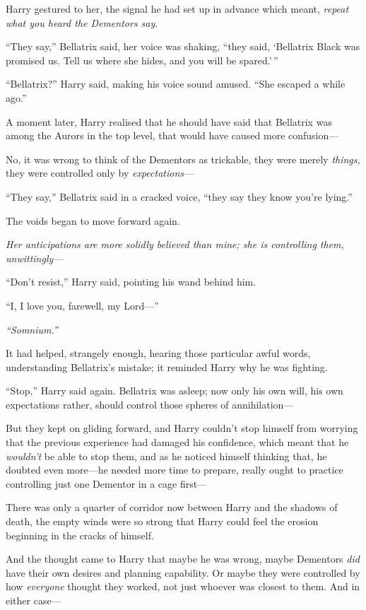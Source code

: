Harry gestured to her, the signal he had set up in advance which meant,
\emph{repeat what you heard the Dementors say.}

``They say,'' Bellatrix said, her voice was shaking, ``they said,
`Bellatrix Black was promised us. Tell us where she hides, and you will
be spared.'\,''

``Bellatrix?'' Harry said, making his voice sound amused. ``She escaped
a while ago.''

A moment later, Harry realised that he should have said that Bellatrix
was among the Aurors in the top level, that would have caused more
confusion---

No, it was wrong to think of the Dementors as trickable, they were
merely \emph{things,} they were controlled only by
\emph{expectations---}

``They say,'' Bellatrix said in a cracked voice, ``they say they know
you're lying.''

The voids began to move forward again.

\emph{Her anticipations are more solidly believed than mine; she is
controlling them, unwittingly---}

``Don't resist,'' Harry said, pointing his wand behind him.

``I, I love you, farewell, my Lord---''

\emph{``Somnium.''}

It had helped, strangely enough, hearing those particular awful words,
understanding Bellatrix's mistake; it reminded Harry why he was
fighting.

``Stop,'' Harry said again. Bellatrix was asleep; now only his own will,
his own expectations rather, should control those spheres of
annihilation---

But they kept on gliding forward, and Harry couldn't stop himself from
worrying that the previous experience had damaged his confidence, which
meant that he \emph{wouldn't} be able to stop them, and as he noticed
himself thinking that, he doubted even more---he needed more time to
prepare, really ought to practice controlling just one Dementor in a
cage first---

There was only a quarter of corridor now between Harry and the shadows
of death, the empty winds were so strong that Harry could feel the
erosion beginning in the cracks of himself.

And the thought came to Harry that maybe he was wrong, maybe Dementors
\emph{did} have their own desires and planning capability. Or maybe they
were controlled by how \emph{everyone} thought they worked, not just
whoever was closest to them. And in either case---

